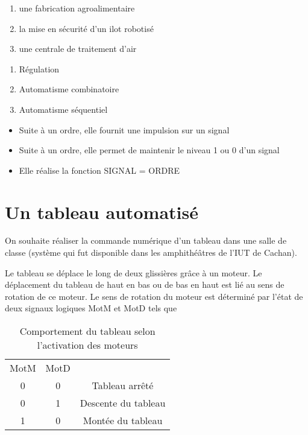 \documentclass[11pt, multicol]{article}
\begin{document}

\begin{minipage}{.48\textwidth}
  \begin{enumerate}
    \item une fabrication agroalimentaire
    \item la mise en sécurité d’un ilot robotisé
    \item une centrale de traitement d’air
  \end{enumerate}
\end{minipage}
\begin{minipage}{.48\textwidth}
  \begin{enumerate}[label=\alph*]
    \item Régulation
    \item Automatisme combinatoire
    \item Automatisme séquentiel
  \end{enumerate}
\end{minipage}


\begin{itemize}
  \item Suite à un ordre, elle fournit une impulsion sur un signal
  \item Suite à un ordre, elle permet de maintenir le niveau 1 ou 0 d’un signal
  \item Elle réalise la fonction SIGNAL = ORDRE
\end{itemize}



\section{Un tableau automatisé}
On souhaite réaliser la commande numérique d’un tableau dans une salle de classe (système qui fut disponible
dans les amphithéâtres de l’IUT de Cachan).

Le tableau se déplace le long de deux glissières grâce à un moteur. Le déplacement du tableau de haut en bas ou
de bas en haut est lié au sens de rotation de ce moteur. Le sens de rotation du moteur est déterminé par l’état de
deux signaux logiques MotM et MotD tels que

\begin{table}[hb]
\centering
  \begin{tabular}{c|c|c}
    MotM & MotD &\\
    0     & 0   & Tableau arrêté\\
    0&1&Descente du tableau\\
    1&0&Montée du tableau
  \end{tabular}
  \caption{Comportement du tableau selon l'activation des moteurs}
  \label{tab:sortieTableau}
\end{table}
\end{document}

